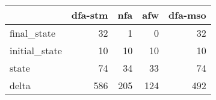 \begin{tabular}{lrrrr}
\toprule
{} &  dfa-stm &  nfa &  afw &  dfa-mso \\
\midrule
final\_state   &       32 &    1 &    0 &       32 \\
initial\_state &       10 &   10 &   10 &       10 \\
state         &       74 &   34 &   33 &       74 \\
delta         &      586 &  205 &  124 &      492 \\
\bottomrule
\end{tabular}
